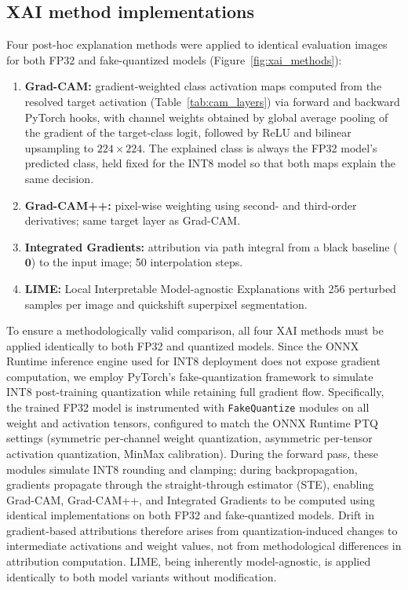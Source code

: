 \documentclass[fleqn,10pt]{wlscirep}
\begin{document}
\subsection*{XAI method implementations}

Four post-hoc explanation methods were applied to identical evaluation images for both FP32 and fake-quantized models (Figure~\ref{fig:xai_methods}):

\begin{enumerate}[leftmargin=1.5em, itemsep=2pt]
  \item \textbf{Grad-CAM\cite{Selvaraju2017gradcam}:} gradient-weighted class activation maps computed from the resolved target activation (Table~\ref{tab:cam_layers}) via forward and backward PyTorch hooks, with channel weights obtained by global average pooling of the gradient of the target-class logit, followed by ReLU and bilinear upsampling to $224 \times 224$. The explained class is always the FP32 model's predicted class, held fixed for the INT8 model so that both maps explain the same decision.
  \item \textbf{Grad-CAM++\cite{Chattopadhay2018gradcampp}:} pixel-wise weighting using second- and third-order derivatives; same target layer as Grad-CAM.
  \item \textbf{Integrated Gradients\cite{Sundararajan2017ig}:} attribution via path integral from a black baseline ($\mathbf{0}$) to the input image; 50 interpolation steps.
  \item \textbf{LIME\cite{Ribeiro2016lime}:} Local Interpretable Model-agnostic Explanations with 256 perturbed samples per image and quickshift superpixel segmentation.
\end{enumerate}

To ensure a methodologically valid comparison, all four XAI methods must be applied identically to both FP32 and quantized models. Since the ONNX Runtime inference engine used for INT8 deployment does not expose gradient computation, we employ PyTorch's fake-quantization framework to simulate INT8 post-training quantization while retaining full gradient flow. Specifically, the trained FP32 model is instrumented with \texttt{FakeQuantize} modules on all weight and activation tensors, configured to match the ONNX Runtime PTQ settings (symmetric per-channel weight quantization, asymmetric per-tensor activation quantization, MinMax calibration). During the forward pass, these modules simulate INT8 rounding and clamping; during backpropagation, gradients propagate through the straight-through estimator (STE)\cite{Jacob2018quantization}, enabling Grad-CAM, Grad-CAM++, and Integrated Gradients to be computed using identical implementations on both FP32 and fake-quantized models. Drift in gradient-based attributions therefore arises from quantization-induced changes to intermediate activations and weight values, not from methodological differences in attribution computation. LIME, being inherently model-agnostic, is applied identically to both model variants without modification.
\end{document}
